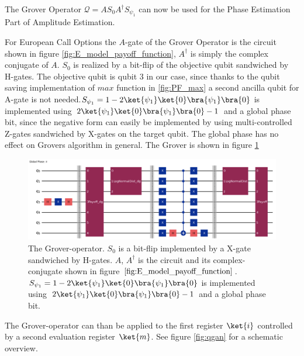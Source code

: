 \documentclass[../main.tex]{subfiles}
\begin{document}
The Grover Operator $\mathcal{Q}=AS_0A^\dagger S_{\psi_1}$ can now be used for the Phase Estimation Part of Amplitude Estimation. 

For European Call Options the $A$-gate of the Grover Operator is the circuit shown in figure \ref{fig:E_model_payoff_function}, $A^{\dagger}$ is simply the complex conjugate of $A$. $S_0$ is realized by a bit-flip of the objective qubit sandwiched by H-gates. The objective qubit is qubit 3 in our case, since thanks to the qubit saving implementation of $max$ function in 
\ref{fig:PF_max} a second ancilla qubit for A-gate is not needed.$S_{\psi_1} = 1-2\ket{\psi_1}\ket{0}\bra{\psi_1}\bra{0}$ is implemented using $2\ket{\psi_1}\ket{0}\bra{\psi_1}\bra{0}-1$
and a global phase bit, since the negative form can easily be implemented by using multi-controlled Z-gates sandwiched by X-gates on the target qubit. The global phase has no effect on Grovers algorithm in general. The Grover is shown in figure \ref{fig:grover}

 \begin{figure}[H]
  \begin{center}
    \includegraphics[width=\linewidth]{../../images/grover.png}
  \end{center}
  \caption{The Grover-operator. $S_0$ is a bit-flip implemented by a X-gate sandwiched by H-gates. $A$, $A^{\dagger}$ is the circuit and its complex-conjugate shown in figure $\ref{fig:E_model_payoff_function}$.\\
  $S_{\psi_1} = 1-2\ket{\psi_1}\ket{0}\bra{\psi_1}\bra{0}$ is implemented using $2\ket{\psi_1}\ket{0}\bra{\psi_1}\bra{0}-1$ and a global phase bit.}
  \label{fig:grover}
\end{figure}

The Grover-operator can than be applied to the first register $\ket{i}$ controlled by a second evaluation register $\ket{m}$. See figure \ref{fig:qgan} for a schematic overview.\\
\end{document}
